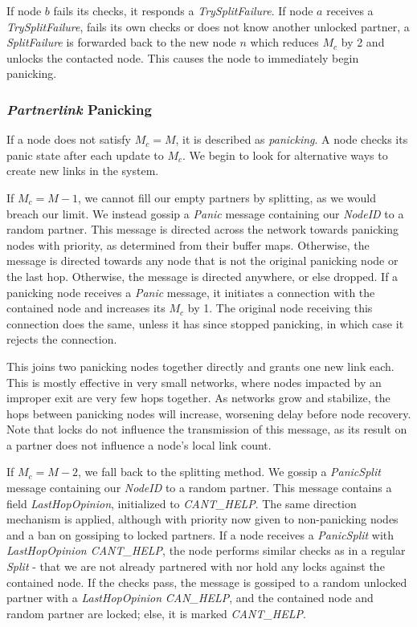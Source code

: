 \documentclass[12pt,a4paper]{article}
\begin{document}
If node \(b\) fails its checks, it responds a \textit{TrySplitFailure}. If node \(a\) receives a \textit{TrySplitFailure}, fails its own checks or does not know another unlocked partner, a \textit{SplitFailure} is forwarded back to the new node \(n\) which reduces \(M_c\) by 2 and unlocks the contacted node. This causes the node to immediately begin panicking.

\subsubsection{\textit{Partnerlink} Panicking} \label{css:partnerlink:panicking}
If a node does not satisfy \(M_c = M\), it is described as \textit{panicking}. A node checks its panic state after each update to \(M_c\). We begin to look for alternative ways to create new links in the system.

If \(M_c = M - 1\), we cannot fill our empty partners by splitting, as we would breach our limit. We instead gossip a 
\textit{Panic} message containing our \textit{NodeID} to a random partner. This message is directed across the network towards panicking nodes with priority, as determined from their buffer maps. Otherwise, the message is directed towards any node that is not the original panicking node or the last hop. Otherwise, the message is directed anywhere, or else dropped. If a panicking node receives a \textit{Panic} message, it initiates a connection with the contained node and increases its \(M_c\) by 1. The original node receiving this connection does the same, unless it has since stopped panicking, in which case it rejects the connection.

This joins two panicking nodes together directly and grants one new link each. This is mostly effective in very small networks, where nodes impacted by an improper exit are very few hops together. As networks grow and stabilize, the hops between panicking nodes will increase, worsening delay before node recovery. Note that locks do not influence the transmission of this message, as its result on a partner does not influence a node's local link count.

If \(M_c = M - 2\), we fall back to the splitting method. We gossip a \textit{PanicSplit} message containing our \textit{NodeID} to a random partner. This message contains a field \textit{LastHopOpinion}, initialized to \textit{CANT\_HELP}. The same direction mechanism is applied, although with priority now given to non-panicking nodes and a ban on gossiping to locked partners. If a node receives a \textit{PanicSplit} with \textit{LastHopOpinion CANT\_HELP}, the node performs similar checks as in a regular \textit{Split} - that we are not already partnered with nor hold any locks against the contained node. If the checks pass, the message is gossiped to a random unlocked partner with a \textit{LastHopOpinion} \textit{CAN\_HELP}, and the contained node and random partner are locked; else, it is marked \textit{CANT\_HELP}.
\end{document}
